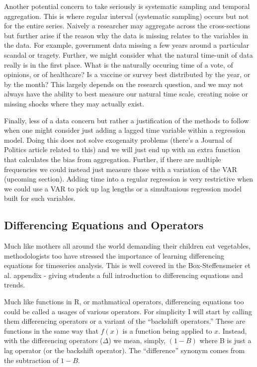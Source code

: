 \documentclass[12pt]{article}\usepackage[]{graphicx}\usepackage[]{color}
\begin{document}
\begin{flushleft}
Another potential concern to take seriously is systematic sampling and temporal aggregation. This is where regular interval (systematic sampling) occurs but not for the entire series. Naively a researcher may aggregate across the cross-sections but further arise if the reason why the data is missing relates to the variables in the data. For example, government data missing a few years around a particular scandal or tragety. Further, we might consider what the natural time-unit of data really is in the first place. What is the naturally occuring time of a vote, of opinions, or of healthcare? Is a vaccine or survey best distributed by the year, or by the month? This largely depends on the research question, and we may not always have the ability to best measure our natural time scale, creating noise or missing shocks where they may actually exist. 

Finally, less of a data concern but rather a justification of the methods to follow when one might consider just adding a lagged time variable within a regression model. Doing this does not solve exogenaity problems (there's a Journal of Politics article related to this) and we will just end up with an extra function that calculates the bias from aggregation. Further, if there are multiple frequencies we could instead just measure those with a variation of the VAR (upcoming section). Adding time into a regular regression is very restrictive when we could use a VAR to pick up lag lengths or a simultanious regression model built for such variables.

\subsection{Differencing Equations and Operators}

Much like mothers all around the world demanding their children eat vegetables, methodologists too have stressed the importance of learning differencing equations for timeseries analysis. This is well covered in the Box-Steffensmeier et al. appendix - giving students a full introduction to differencing equations and trends.

Much like functions in R, or mathmatical operators, differencing equations too could be called a usages of various operators. For simplicity I will start by calling them differencing operators or a variant of the ``backshift operators.'' These are functions in the same way that $f(x)$ is a function being applied to $x$. Instead, with the differencing operators ($\Delta$) we mean, simply, $(1-B)$ where B is just a lag operator (or the backshift operator). The ``difference'' synonym comes from the subtraction of $1-B$.


\end{flushleft}
\end{document}
